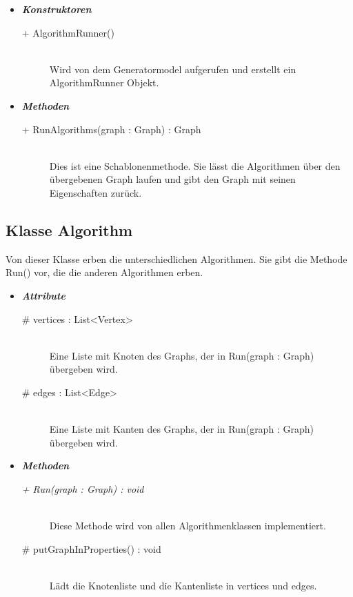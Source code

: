 \documentclass[13pt]{scrreprt}
\begin{document}
	\begin{itemize}[label = {$\circ$}]
		\item {\large \textbf{\textit{Konstruktoren}}\par}
		\begin{description}
			\item [+ AlgorithmRunner()] \hfill \\Wird von dem Generatormodel aufgerufen und erstellt ein AlgorithmRunner Objekt.
		\end{description}
		\item {\large \textbf{\textit{Methoden}}\par}
		\begin{description}
			\item[+ RunAlgorithms(graph : Graph) : Graph] \hfill \\Dies ist eine Schablonenmethode. Sie lässt die Algorithmen über den übergebenen Graph laufen und gibt den Graph mit seinen Eigenschaften zurück.
		\end{description}
	\end{itemize}
	
	\subsection{Klasse Algorithm}
	
	Von dieser Klasse erben die unterschiedlichen Algorithmen.
	Sie gibt die Methode Run() vor, die die anderen Algorithmen erben.
	
	\begin{itemize}[label = {$\circ$}]
		\item {\large \textbf{\textit{Attribute}} \par}
		\begin{description}
			\item[\# vertices : List<Vertex>] \hfill \\ Eine Liste mit Knoten des Graphs, der in Run(graph : Graph) übergeben wird.
			\item[\# edges : List<Edge>] \hfill \\Eine Liste mit Kanten des Graphs, der in Run(graph : Graph) übergeben wird.
		\end{description}
		\item {\large \textbf{\textit{Methoden}}\par}
		\begin{description}
			\item [\textit{+ Run(graph : Graph) : void}] \hfill \\ Diese Methode wird von allen Algorithmenklassen implementiert.
			\item[\# putGraphInProperties() : void] \hfill \\Lädt die Knotenliste und die Kantenliste in vertices und edges.
		\end{description}
	\end{itemize}
	
\end{document}
